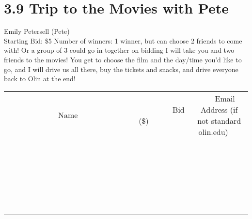 \documentclass[11pt]{article}
\begin{document}
\section*{3.9 Trip to the Movies with Pete}
Emily Petersell (Pete)
\\
Starting Bid: \$5
\newline
Number of winners: 1 winner, but can choose 2 friends to come with! Or a group of 3 could go in together on bidding
\newline
I will take you and two friends to the movies! You get to choose the film and the day/time you'd like to go, and I will drive us all there, buy the tickets and snacks, and drive everyone back to Olin at the end!
\\[6ex]
\begin{tabular}{c c c}
~~~~~~~~~~~~~Name~~~~~~~~~~~~~ & ~~~~~~~~~Bid (\$)~~~~~~~~~  & ~~~Email Address (if not standard olin.edu)~~~\\
 & & \\
\hline
 & & \\
\hline
 & & \\
\hline
 & & \\
\hline
 & & \\
\hline
 & & \\
\hline
 & & \\
\hline
 & & \\
\hline
 & & \\
\hline
 & & \\
\hline
 & & \\
\hline
 & & \\
\hline
 & & \\
\hline
 & & \\
\hline
 & & \\
\hline
 & & \\
\hline
 & & \\
\hline
 & & \\
\hline
 & & \\
\hline
 & & \\
\hline
 & & \\
\hline
 & & \\
\hline
 & & \\
\hline
 & & \\
\hline
 & & \\
\hline
 & & \\
\hline
\end{tabular}
\newpage
\end{document}
